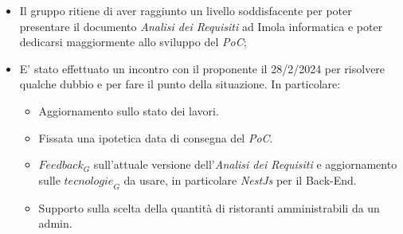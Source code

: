 \begin{itemize}
    \item Il gruppo ritiene di aver raggiunto un livello soddisfacente per poter presentare il documento \emph{Analisi dei Requisiti} ad Imola informatica e poter dedicarsi maggiormente allo sviluppo del \emph{PoC};
    \item E' stato effettuato un incontro con il proponente il 28/2/2024 per risolvere qualche dubbio e per fare il punto della situazione. In particolare:
    \begin{itemize}
        \item Aggiornamento sullo stato dei lavori.
        \item Fissata una ipotetica data di consegna del \emph{PoC}.
        \item $\textit{Feedback}_G$ sull'attuale versione dell'\emph{Analisi dei Requisiti} e aggiornamento  sulle $\textit{tecnologie}_G$ da usare, in particolare \emph{NestJs} per il Back-End.
        \item Supporto sulla scelta della quantità di ristoranti amministrabili da un admin.
        
    \end{itemize}
\end{itemize}
